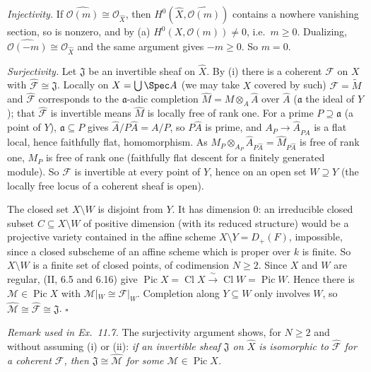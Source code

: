 \documentclass[11pt]{article}
\begin{document}
\emph{Injectivity.} If $\widehat{\mathcal O(m)}\cong\mathcal O_{\widehat X}$, then $H^0(\widehat X,\widehat{\mathcal O(m)})$ contains a nowhere vanishing section, so is nonzero, and by (a) $H^0(X,\mathcal O(m))\ne0$, i.e.\ $m\ge0$. Dualizing, $\widehat{\mathcal O(-m)}\cong\mathcal O_{\widehat X}$ and the same argument gives $-m\ge0$. So $m=0$.

\emph{Surjectivity.} Let $\mathfrak J$ be an invertible sheaf on $\widehat X$. By (i) there is a coherent $\mathcal F$ on $X$ with $\widehat{\mathcal F}\cong\mathfrak J$. Locally on $X=\bigcup\Spec A$ (we may take $X$ covered by such) $\mathcal F=\widetilde M$ and $\widehat{\mathcal F}$ corresponds to the $\mathfrak a$-adic completion $\widehat M=M\otimes_A\widehat A$ over $\widehat A$ ($\mathfrak a$ the ideal of $Y$); that $\widehat{\mathcal F}$ is invertible means $\widehat M$ is locally free of rank one. For a prime $P\supseteq\mathfrak a$ (a point of $Y$), $\mathfrak a\subseteq P$ gives $\widehat A/P\widehat A=A/P$, so $P\widehat A$ is prime, and $A_P\to\widehat A_{P\widehat A}$ is a flat local, hence faithfully flat, homomorphism. As $M_P\otimes_{A_P}\widehat A_{P\widehat A}=\widehat M_{P\widehat A}$ is free of rank one, $M_P$ is free of rank one (faithfully flat descent for a finitely generated module). So $\mathcal F$ is invertible at every point of $Y$, hence on an open set $W\supseteq Y$ (the locally free locus of a coherent sheaf is open).

The closed set $X\setminus W$ is disjoint from $Y$. It has dimension $0$: an irreducible closed subset $C\subseteq X\setminus W$ of positive dimension (with its reduced structure) would be a projective variety contained in the affine scheme $X\setminus Y=D_+(F)$, impossible, since a closed subscheme of an affine scheme which is proper over $k$ is finite. So $X\setminus W$ is a finite set of closed points, of codimension $N\ge2$. Since $X$ and $W$ are regular, (II, 6.5 and 6.16) give $\operatorname{Pic}X=\operatorname{Cl}X\xrightarrow{\ \sim\ }\operatorname{Cl}W=\operatorname{Pic}W$. Hence there is $\mathcal M\in\operatorname{Pic}X$ with $\mathcal M|_W\cong\mathcal F|_W$. Completion along $Y\subseteq W$ only involves $W$, so $\widehat{\mathcal M}\cong\widehat{\mathcal F}\cong\mathfrak J$. \hfill$\square$

\medskip
\noindent\emph{Remark used in Ex.~11.7.} The surjectivity argument shows, for $N\ge2$ and without assuming (i) or (ii): \emph{if an invertible sheaf $\mathfrak J$ on $\widehat X$ is isomorphic to $\widehat{\mathcal F}$ for a coherent $\mathcal F$, then $\mathfrak J\cong\widehat{\mathcal M}$ for some $\mathcal M\in\operatorname{Pic}X$.}
\end{document}
